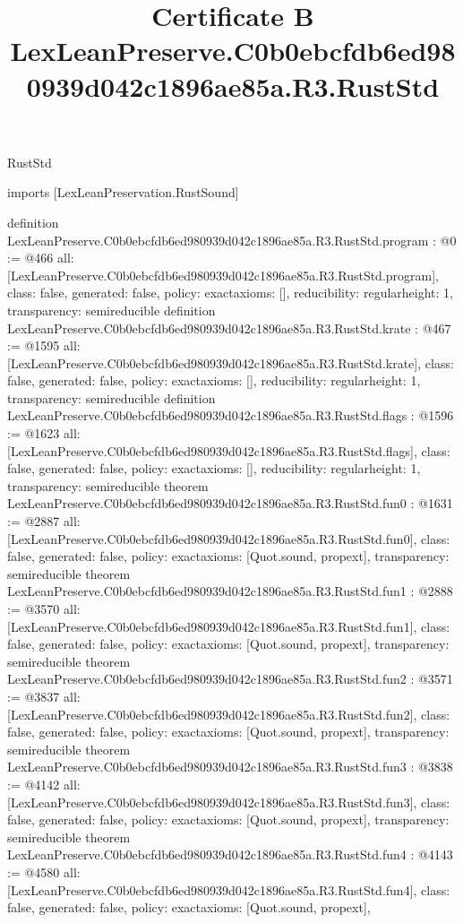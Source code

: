 \begin{lexlean}{RustStd}
\title{Certificate B LexLeanPreserve.C0b0ebcfdb6ed980939d042c1896ae85a.R3.RustStd}
\begin{coremodule}
imports [LexLeanPreservation.RustSound]

definition LexLeanPreserve.C0b0ebcfdb6ed980939d042c1896ae85a.R3.RustStd.program : @0 := @466 {
  all: [LexLeanPreserve.C0b0ebcfdb6ed980939d042c1896ae85a.R3.RustStd.program],
  class: false,
  generated: false,
  policy: exact{axioms: []},
  reducibility: regular{height: 1},
  transparency: semireducible
}
definition LexLeanPreserve.C0b0ebcfdb6ed980939d042c1896ae85a.R3.RustStd.krate : @467 := @1595 {
  all: [LexLeanPreserve.C0b0ebcfdb6ed980939d042c1896ae85a.R3.RustStd.krate],
  class: false,
  generated: false,
  policy: exact{axioms: []},
  reducibility: regular{height: 1},
  transparency: semireducible
}
definition LexLeanPreserve.C0b0ebcfdb6ed980939d042c1896ae85a.R3.RustStd.flags : @1596 := @1623 {
  all: [LexLeanPreserve.C0b0ebcfdb6ed980939d042c1896ae85a.R3.RustStd.flags],
  class: false,
  generated: false,
  policy: exact{axioms: []},
  reducibility: regular{height: 1},
  transparency: semireducible
}
theorem LexLeanPreserve.C0b0ebcfdb6ed980939d042c1896ae85a.R3.RustStd.fun0 : @1631 := @2887 {
  all: [LexLeanPreserve.C0b0ebcfdb6ed980939d042c1896ae85a.R3.RustStd.fun0],
  class: false,
  generated: false,
  policy: exact{axioms: [Quot.sound, propext]},
  transparency: semireducible
}
theorem LexLeanPreserve.C0b0ebcfdb6ed980939d042c1896ae85a.R3.RustStd.fun1 : @2888 := @3570 {
  all: [LexLeanPreserve.C0b0ebcfdb6ed980939d042c1896ae85a.R3.RustStd.fun1],
  class: false,
  generated: false,
  policy: exact{axioms: [Quot.sound, propext]},
  transparency: semireducible
}
theorem LexLeanPreserve.C0b0ebcfdb6ed980939d042c1896ae85a.R3.RustStd.fun2 : @3571 := @3837 {
  all: [LexLeanPreserve.C0b0ebcfdb6ed980939d042c1896ae85a.R3.RustStd.fun2],
  class: false,
  generated: false,
  policy: exact{axioms: [Quot.sound, propext]},
  transparency: semireducible
}
theorem LexLeanPreserve.C0b0ebcfdb6ed980939d042c1896ae85a.R3.RustStd.fun3 : @3838 := @4142 {
  all: [LexLeanPreserve.C0b0ebcfdb6ed980939d042c1896ae85a.R3.RustStd.fun3],
  class: false,
  generated: false,
  policy: exact{axioms: [Quot.sound, propext]},
  transparency: semireducible
}
theorem LexLeanPreserve.C0b0ebcfdb6ed980939d042c1896ae85a.R3.RustStd.fun4 : @4143 := @4580 {
  all: [LexLeanPreserve.C0b0ebcfdb6ed980939d042c1896ae85a.R3.RustStd.fun4],
  class: false,
  generated: false,
  policy: exact{axioms: [Quot.sound, propext]},
}
\end{coremodule}
\end{lexlean}
